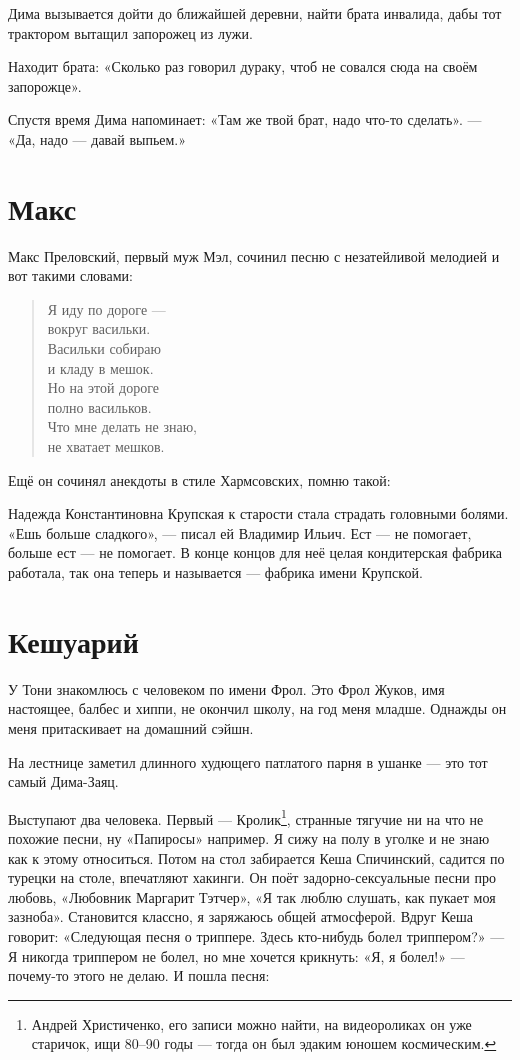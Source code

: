 \documentclass{book}
\begin{document}
Дима вызывается дойти до ближайшей деревни, найти брата инвалида, дабы тот трактором вытащил запорожец из лужи.

Находит брата:
«Сколько раз говорил дураку, чтоб не совался сюда на своём запорожце».

Спустя время Дима напоминает: «Там же твой брат, надо что-то сделать». --- «Да, надо --- давай выпьем.»

\section*{Макс}

Макс Преловский, первый муж Мэл, сочинил песню с незатейливой мелодией и вот такими словами:
\begin{verse}
Я иду по дороге ---
\\
\qquad вокруг васильки.
\\
Васильки собираю
\\
\qquad и кладу в мешок.
\\
Но на этой дороге
\\
\qquad полно васильков.
\\
Что мне делать не знаю,
\\
\qquad не хватает мешков.
\end{verse}

Ещё он сочинял анекдоты в стиле Хармсовских, помню такой:

Надежда Константиновна Крупская к старости стала страдать головными болями.
«Ешь больше сладкого», --- писал ей Владимир Ильич.
Ест --- не помогает, больше ест --- не помогает.
В конце концов для неё целая кондитерская фабрика работала, так она теперь и называется --- фабрика имени Крупской.




\section*{Кешуарий}

У Тони знакомлюсь с человеком по имени Фрол.
Это Фрол Жуков, имя настоящее, балбес и хиппи, не окончил школу, на год меня младше.
Однажды он меня притаскивает на домашний сэйшн.

На лестнице заметил длинного худющего патлатого парня в ушанке 
--- это тот самый Дима-Заяц.

Выступают два человека.
Первый --- Кролик\footnote{Андрей Христиченко, его записи можно найти, на видеороликах он уже старичок, ищи 80--90 годы --- тогда он был эдаким юношем космическим.},
странные тягучие ни на что не похожие песни, ну «Папиросы» например.
Я сижу на полу в уголке и не знаю как к этому относиться.
Потом на стол забирается Кеша Спичинский, садится по турецки на столе,
впечатляют хакинги.
Он поёт задорно-сексуальные песни про любовь,
«Любовник Маргарит Тэтчер», 
«Я так люблю слушать, как пукает моя зазноба».
Становится классно, я заряжаюсь общей атмосферой.
Вдруг Кеша говорит: «Следующая песня о триппере.
Здесь кто-нибудь болел триппером?» --- Я никогда триппером не болел, но мне хочется крикнуть: «Я, я болел!» --- почему-то этого не делаю.
И пошла песня:
\end{document}

